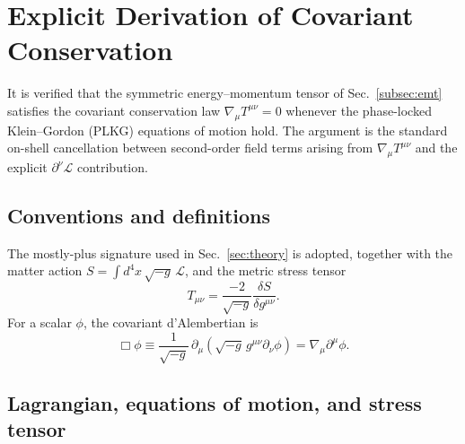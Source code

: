 
\section{Explicit Derivation of Covariant Conservation}
\label{app:conservation}

It is verified that the symmetric energy--momentum tensor of Sec.~\ref{subsec:emt} satisfies the covariant conservation law $\nabla_\mu T^{\mu\nu}=0$ whenever the phase-locked Klein--Gordon (PLKG) equations of motion hold.
The argument is the standard on-shell cancellation between second-order field terms arising from $\nabla_\mu T^{\mu\nu}$ and the explicit $\partial^\nu\mathcal{L}$ contribution.

\subsection{Conventions and definitions}

The mostly-plus signature used in Sec.~\ref{sec:theory} is adopted, together with the matter action $S=\int d^4x\,\sqrt{-g}\,\mathcal{L}$, and the metric stress tensor
\begin{equation}
T_{\mu\nu}=\frac{-2}{\sqrt{-g}}\frac{\delta S}{\delta g^{\mu\nu}} .
\end{equation}
For a scalar $\phi$, the covariant d'Alembertian is
\begin{equation}
\Box\phi\equiv\frac{1}{\sqrt{-g}}\,\partial_\mu\!\left(\sqrt{-g}\,g^{\mu\nu}\partial_\nu\phi\right)
=\nabla_\mu\partial^\mu\phi .
\label{eq:box_def_app}
\end{equation}

\subsection{Lagrangian, equations of motion, and stress tensor}

